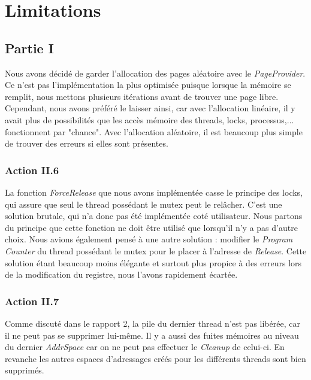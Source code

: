 \documentclass{article}
\begin{document}
\section{Limitations}
\subsection{Partie I}
Nous avons décidé de garder l'allocation des pages aléatoire avec le \textit{PageProvider}. Ce n'est pas
l'implémentation la plus optimisée puisque lorsque la mémoire se remplit, nous mettons plusieurs itérations avant
de trouver une page libre. Cependant, nous avons préféré le laisser ainsi, car avec l'allocation linéaire, il y avait
plus de possibilités que les accès mémoire des threads, locks, processus,... fonctionnent par "chance". Avec l'allocation
aléatoire, il est beaucoup plus simple de trouver des erreurs si elles sont présentes.

\subsubsection{Action II.6}
La fonction \textit{ForceRelease} que nous avons implémentée casse le principe des locks, qui assure que seul le thread possédant le mutex peut le relâcher.
C'est une solution brutale, qui n'a donc pas été implémentée coté utilisateur. Nous partons du principe que cette fonction ne doit être utilisé que
lorsqu'il n'y a pas d'autre choix. Nous avions également pensé à une autre solution : modifier le \textit{Program Counter} du thread possédant
le mutex pour le placer à l'adresse de \textit{Release}. Cette solution étant beaucoup moins élégante et surtout plus propice à des erreurs lors de la
modification du registre, nous l'avons rapidement écartée.

\subsubsection{Action II.7}
Comme discuté dans le rapport 2, la pile du dernier thread n'est pas libérée, car il ne peut pas se supprimer lui-même. Il y a aussi des fuites mémoires au niveau
du dernier \textit{AddrSpace} car on ne peut pas effectuer le \textit{Cleanup} de celui-ci. En revanche les autres espaces d'adressages créés pour les différents
threads sont bien supprimés.
\end{document}

